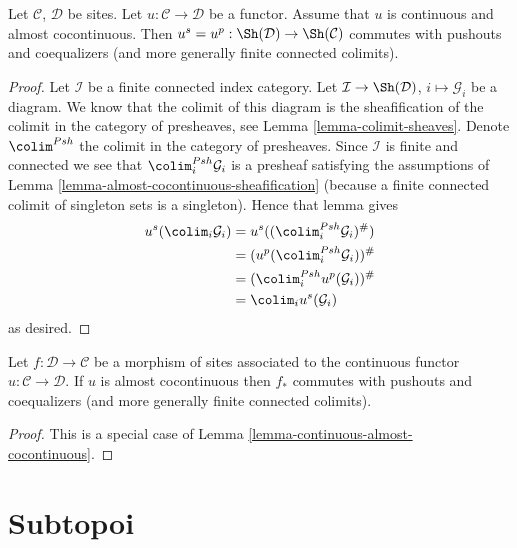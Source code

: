 \begin{lemma}
\label{lemma-continuous-almost-cocontinuous}
Let $\mathcal{C}$, $\mathcal{D}$ be sites.
Let $u : \mathcal{C} \to \mathcal{D}$ be a functor.
Assume that $u$ is continuous and almost cocontinuous.
Then $u^s = u^p : \Sh(\mathcal{D}) \to \Sh(\mathcal{C})$
commutes with pushouts and coequalizers (and more generally
finite connected colimits).
\end{lemma}

\begin{proof}
Let $\mathcal{I}$ be a finite connected index category.
Let $\mathcal{I} \to \Sh(\mathcal{D})$,
$i \mapsto \mathcal{G}_i$ be a diagram. We know that the colimit of
this diagram is the sheafification of the colimit in the category of
presheaves, see
Lemma \ref{lemma-colimit-sheaves}.
Denote $\colim^{Psh}$ the colimit in the category
of presheaves. Since $\mathcal{I}$ is finite and connected
we see that $\colim^{Psh}_i \mathcal{G}_i$
is a presheaf satisfying the assumptions of
Lemma \ref{lemma-almost-cocontinuous-sheafification}
(because a finite connected colimit of singleton sets is a
singleton). Hence that lemma gives
\begin{align*}
u^s(\colim_i \mathcal{G}_i) & =
u^s((\colim^{Psh}_i \mathcal{G}_i)^\#) \\
& = (u^p(\colim^{Psh}_i \mathcal{G}_i))^\# \\
& = (\colim^{Psh}_i u^p(\mathcal{G}_i))^\# \\
& = \colim_i u^s(\mathcal{G}_i)
\end{align*}
as desired.
\end{proof}

\begin{lemma}
\label{lemma-morphism-of-sites-almost-cocontinuous}
Let $f : \mathcal{D} \to \mathcal{C}$ be a morphism of sites
associated to the continuous functor $u : \mathcal{C} \to \mathcal{D}$.
If $u$ is almost cocontinuous then $f_*$ commutes with
pushouts and coequalizers (and more generally finite connected colimits).
\end{lemma}

\begin{proof}
This is a special case of Lemma \ref{lemma-continuous-almost-cocontinuous}.
\end{proof}








\section{Subtopoi}
\label{section-subtopoi}

